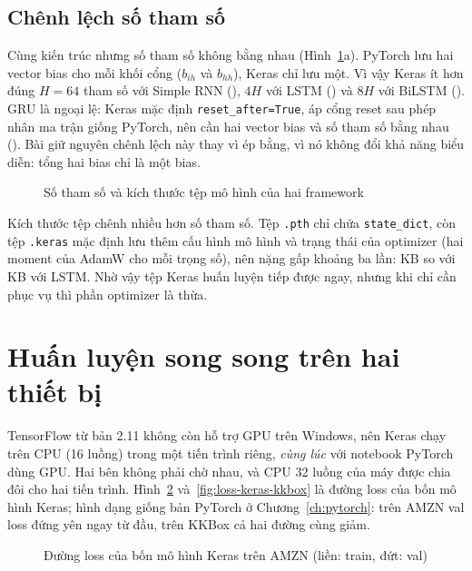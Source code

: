 \subsection{Chênh lệch số tham số}

Cùng kiến trúc nhưng số tham số không bằng nhau (Hình~\ref{fig:size}a). PyTorch lưu hai vector bias cho mỗi khối cổng
($b_{ih}$ và $b_{hh}$), Keras chỉ lưu một. Vì vậy Keras ít hơn đúng $H = 64$ tham số với Simple RNN
(), $4H$ với LSTM () và $8H$ với BiLSTM
(). GRU là ngoại lệ: Keras mặc định \texttt{reset\_after=True}, áp cổng reset sau
phép nhân ma trận giống PyTorch, nên cần hai vector bias và số tham số bằng nhau
(). Bài giữ nguyên chênh lệch này thay vì ép bằng, vì nó không đổi khả năng biểu
diễn: tổng hai bias chỉ là một bias.

\begin{figure}[H]
  \centering
  \caption{Số tham số và kích thước tệp mô hình của hai framework}
  \label{fig:size}
\end{figure}

Kích thước tệp chênh nhiều hơn số tham số. Tệp \texttt{.pth} chỉ chứa \texttt{state\_dict}, còn tệp \texttt{.keras}
mặc định lưu thêm cấu hình mô hình và trạng thái của optimizer (hai moment của AdamW cho mỗi trọng số), nên nặng gấp
khoảng ba lần:  KB so với  KB với LSTM.
Nhờ vậy tệp Keras huấn luyện tiếp được ngay, nhưng khi chỉ cần phục vụ thì phần optimizer là thừa.

\section{Huấn luyện song song trên hai thiết bị}

TensorFlow từ bản 2.11 không còn hỗ trợ GPU trên Windows, nên Keras chạy trên CPU (16 luồng) trong một tiến trình riêng,
\emph{cùng lúc} với notebook PyTorch dùng GPU. Hai bên không phải chờ nhau, và CPU 32 luồng của máy được chia đôi cho hai
tiến trình. Hình~\ref{fig:loss-keras-amzn} và~\ref{fig:loss-keras-kkbox} là đường loss của bốn mô hình Keras; hình dạng
giống bản PyTorch ở Chương~\ref{ch:pytorch}: trên AMZN val loss đứng yên ngay từ đầu, trên KKBox cả hai đường cùng giảm.

\begin{figure}[H]
  \centering
  \caption{Đường loss của bốn mô hình Keras trên AMZN (liền: train, đứt: val)}
  \label{fig:loss-keras-amzn}
\end{figure}

